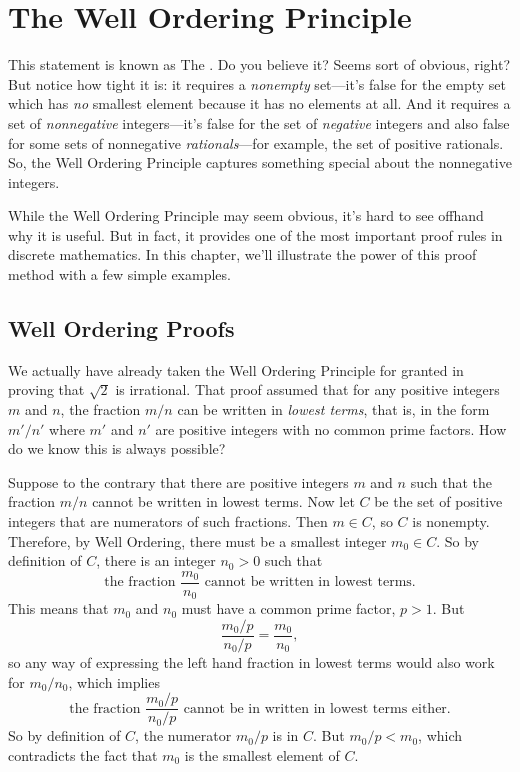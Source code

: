 \chapter{The Well Ordering Principle}\label{well_ordering_chap}


This statement is known as The .  Do you
believe it?  Seems sort of obvious, right?  But notice how tight it is: it
requires a \emph{nonempty} set---it's false for the empty set which has
\emph{no} smallest element because it has no elements at all.  And it
requires a set of \emph{nonnegative} integers---it's false for the set of
\emph{negative} integers and also false for some sets of nonnegative
\emph{rationals}---for example, the set of positive rationals.  So, the
Well Ordering Principle captures something special about the nonnegative
integers.

While the Well Ordering Principle may seem obvious, \iffalse it looks
nothing like the induction axiom, and\fi it's hard to see offhand why
it is useful.  But in fact, it provides one of the most important
proof rules in discrete mathematics.  In this chapter, we'll
illustrate the power of this proof method with a few simple examples.

\iffalse We'll explain this after we introduce a
template for well ordering principle proofs resembling the template in
Section~\ref{templ-induct-proofs} for a proof by strong induction.\fi


\section{Well Ordering Proofs}
We actually have already taken the Well Ordering Principle for granted
in proving that $\sqrt{2}$ is irrational.  That proof assumed that for
any positive integers $m$ and $n$, the fraction $m/n$ can be written
in \emph{lowest terms}, that is, in the form $m'/n'$ where $m'$ and
$n'$ are positive integers with no common prime factors.  How do we
know this is always possible?

Suppose to the contrary that there are positive integers $m$ and $n$
such that the fraction $m/n$ cannot be written in lowest terms.  Now
let $C$ be the set of positive integers that are numerators of such
fractions.  Then $m \in C$, so $C$ is nonempty.  Therefore, by Well
Ordering, there must be a smallest integer $m_0 \in C$.  So by
definition of $C$, there is an integer $n_0 > 0$ such that
\[
\text{the fraction } \frac{m_0}{n_0} \text{ cannot be written in lowest
terms.}
\]
This means that $m_0$ and $n_0$ must have a common prime factor,
$p>1$.  But
\[
\frac{m_0/p}{n_0/p} = \frac{m_0}{n_0},
\]
so any way of expressing the left hand fraction in lowest terms would also
work for $m_0/n_0$, which implies
\[
\text{the fraction } \frac{m_0/p}{n_0/p} \text{ cannot be in written in
lowest terms either.}
\]
So by definition of $C$, the numerator $m_0/p$ is in $C$.  But $m_0/p <
m_0$, which contradicts the fact that $m_0$ is the smallest element of $C$.

